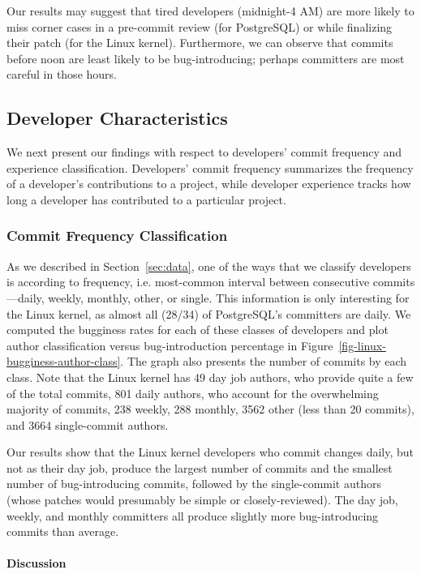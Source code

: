 Our results may suggest that tired developers (midnight-4 AM) are more likely to
miss corner cases in a pre-commit review (for PostgreSQL) or while finalizing
their patch (for the Linux kernel). Furthermore, we can observe that commits
before noon are least likely to be bug-introducing; perhaps committers are most
careful in those hours.

\subsection{Developer Characteristics}
\label{sec-dev-char}

We next present our findings with respect to developers' commit frequency and
experience classification. Developers' commit frequency summarizes the frequency
of a developer's contributions to a project, while developer experience tracks
how long a developer has contributed to a particular project.

\subsubsection{Commit Frequency Classification} 

As we described in Section~\ref{sec:data}, one of the ways that we classify
developers is according to frequency, i.e. most-common interval between
consecutive commits---daily, weekly, monthly, other, or single.  This
information is only interesting for the Linux kernel, as almost all (28/34) of
PostgreSQL's committers are daily. We computed the bugginess rates for each of
these classes of developers and plot author classification versus
bug-introduction percentage in
Figure~\ref{fig-linux-bugginess-author-class}. The graph also presents the
number of commits by each class. Note that the Linux kernel has 49 day job
authors, who provide quite a few of the total commits, 801 daily authors, who
account for the overwhelming majority of commits, 238 weekly, 288 monthly, 3562
other (less than 20 commits), and 3664 single-commit authors.

Our results show that the Linux kernel developers who commit changes daily, but
not as their day job, produce the largest number of commits and the smallest
number of bug-introducing commits, followed by the single-commit authors (whose
patches would presumably be simple or closely-reviewed). The day job, weekly,
and monthly committers all produce slightly more bug-introducing commits than
average.

\paragraph{Discussion}

